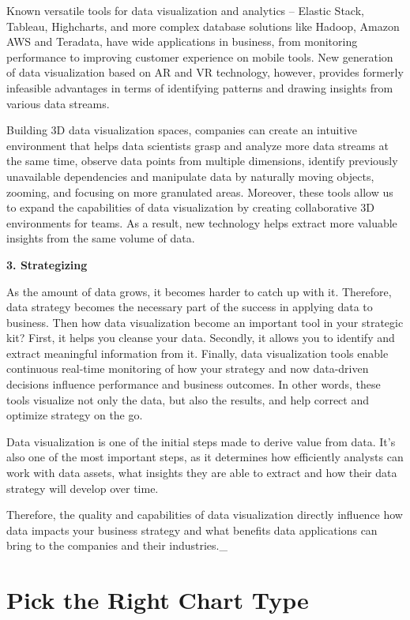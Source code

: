 \documentclass[]{book}
\theoremstyle{definition}
\theoremstyle{definition}
\theoremstyle{definition}
\theoremstyle{remark}
\begin{document}
Known versatile tools for data visualization and analytics -- Elastic
Stack, Tableau, Highcharts, and more complex database solutions like
Hadoop, Amazon AWS and Teradata, have wide applications in business,
from monitoring performance to improving customer experience on mobile
tools. New generation of data visualization based on AR and VR
technology, however, provides formerly infeasible advantages in terms of
identifying patterns and drawing insights from various data streams.

Building 3D data visualization spaces, companies can create an intuitive
environment that helps data scientists grasp and analyze more data
streams at the same time, observe data points from multiple dimensions,
identify previously unavailable dependencies and manipulate data by
naturally moving objects, zooming, and focusing on more granulated
areas. Moreover, these tools allow us to expand the capabilities of data
visualization by creating collaborative 3D environments for teams. As a
result, new technology helps extract more valuable insights from the
same volume of data.

\textbf{3. Strategizing}

As the amount of data grows, it becomes harder to catch up with it.
Therefore, data strategy becomes the necessary part of the success in
applying data to business. Then how data visualization become an
important tool in your strategic kit? First, it helps you cleanse your
data. Secondly, it allows you to identify and extract meaningful
information from it. Finally, data visualization tools enable continuous
real-time monitoring of how your strategy and now data-driven decisions
influence performance and business outcomes. In other words, these tools
visualize not only the data, but also the results, and help correct and
optimize strategy on the go.

Data visualization is one of the initial steps made to derive value from
data. It's also one of the most important steps, as it determines how
efficiently analysts can work with data assets, what insights they are
able to extract and how their data strategy will develop over time.

Therefore, the quality and capabilities of data visualization directly
influence how data impacts your business strategy and what benefits data
applications can bring to the companies and their industries.\_

\section{Pick the Right Chart Type}\label{pick-the-right-chart-type}
\end{document}

